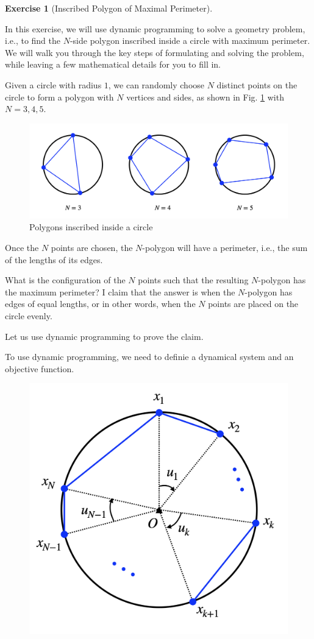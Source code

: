\documentclass[
]{book}
\theoremstyle{definition}
\theoremstyle{definition}
\theoremstyle{definition}
\newtheorem{exercise}{Exercise}[chapter]
\theoremstyle{definition}
\theoremstyle{remark}
\begin{document}
\begin{exercise}[Inscribed Polygon of Maximal Perimeter]
\protect\hypertarget{exr:polygoninsidecircle}{}\label{exr:polygoninsidecircle}

In this exercise, we will use dynamic programming to solve a geometry problem, i.e., to find the \(N\)-side polygon inscribed inside a circle with maximum perimeter. We will walk you through the key steps of formulating and solving the problem, while leaving a few mathematical details for you to fill in.

Given a circle with radius \(1\), we can randomly choose \(N\) distinct points on the circle to form a polygon with \(N\) vertices and sides, as shown in Fig. \ref{fig:inscribed-polygon} with \(N=3,4,5\).

\begin{figure}

{\centering \includegraphics[width=0.8\linewidth]{images/polygon-inside-circle} 

}

\caption{Polygons inscribed inside a circle}\label{fig:inscribed-polygon}
\end{figure}

Once the \(N\) points are chosen, the \(N\)-polygon will have a perimeter, i.e., the sum of the lengths of its edges.

What is the configuration of the \(N\) points such that the resulting \(N\)-polygon has the maximum perimeter? I claim that the answer is when the \(N\)-polygon has edges of equal lengths, or in other words, when the \(N\) points are placed on the circle evenly.

Let us use dynamic programming to prove the claim.

To use dynamic programming, we need to definie a dynamical system and an objective function.

\begin{figure}

{\centering \includegraphics[width=0.5\linewidth]{images/sequential-placement-N-point} 

}
\end{figure}
\end{exercise}
\end{document}
